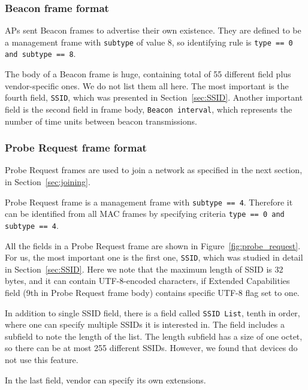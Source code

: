 \documentclass[12pt,a4paper,oneside,pdftex]{report}
\begin{document}
\subsubsection{Beacon frame format}
\label{subsubsec:beacon_frame}

APs sent Beacon frames to advertise their own existence. They are defined to be a management frame with \texttt{subtype} of value 8, so identifying rule is \texttt{type == 0 and subtype == 8}.

The body of a Beacon frame is huge, containing total of 55 different field plus vendor-specific ones. We do not list them all here. The most important is the fourth field, \texttt{SSID}, which was presented in Section~\ref{sec:SSID}. Another important field is the second field in frame body, \texttt{Beacon interval}, which represents the number of time units between beacon transmissions.


\subsubsection{Probe Request frame format}
\label{subsubsec:probe_request}

Probe Request frames are used to join a network as specified in the next section, in Section~\ref{sec:joining}.

Probe Request frame is a management frame with \texttt{subtype == 4}. Therefore it can be identified from all MAC frames by specifying criteria \texttt{type == 0 and subtype == 4}. 

All the fields in a Probe Request frame are shown in Figure~\ref{fig:probe_request}. For us, the most important one is the first one, \texttt{SSID}, which was studied in detail in Section~\ref{sec:SSID}. Here we note that the maximum length of SSID is 32 bytes, and it can contain UTF-8-encoded characters, if Extended Capabilities field (9th in Probe Request frame body) contains specific UTF-8 flag set to one.

In addition to single SSID field, there is a field called \texttt{SSID List}, tenth in order, where one can specify multiple SSIDs it is interested in. The field includes a subfield to note the length of the list. The length subfield has a size of one octet, so there can be at most 255 different SSIDs. However, we found that devices do not use this feature.

In the last field, vendor can specify its own extensions.
\end{document}
